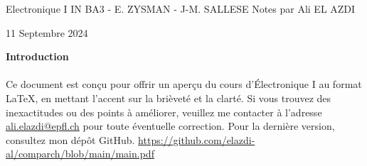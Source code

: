 
\begin{titlepage}
    \centering
    \vspace*{1cm}
    \Huge
    Electronique I \newline
    \vspace{10px}
    \LARGE IN BA3 - E. ZYSMAN - J-M. SALLESE
    \vspace*{10px}
    \newline
    \Large Notes par Ali EL AZDI

    \vfill
    \large
    11 Septembre 2024
\end{titlepage}

\begin{center}
    \vspace*{1cm}
    \textbf{Introduction}
    \newline
    \paragraph[short]{}{Ce document est conçu pour offrir un aperçu du cours d'Électronique I au format \LaTeX{}, en mettant l'accent sur la brièveté et la clarté. Si vous trouvez des inexactitudes ou des points à améliorer, veuillez me contacter à l'adresse \href{mailto:ali.elazdi@epfl.ch}{ali.elazdi@epfl.ch} pour toute éventuelle correction. Pour la dernière version, consultez mon dépôt GitHub.}
    \newline
   \url{https://github.com/elazdi-al/comparch/blob/main/main.pdf}
    \newline
\end{center}


\tableofcontents

